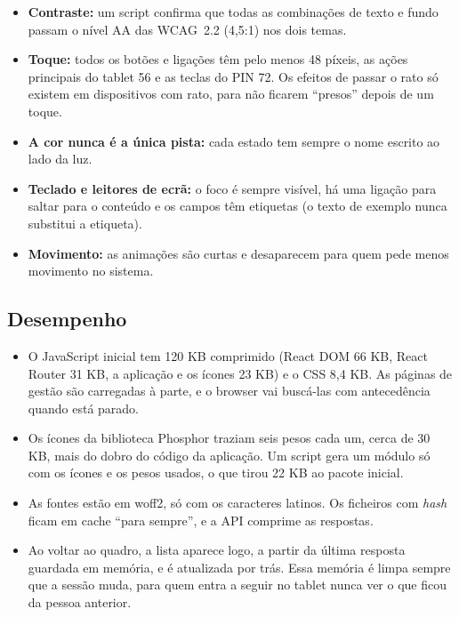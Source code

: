 \documentclass[a4paper,12pt]{article}
\begin{document}
\begin{itemize}
    \item \textbf{Contraste:} um script confirma que todas as combinações de texto e fundo passam o nível AA das \ac{WCAG}~2.2 (4,5:1) nos dois temas.
    \item \textbf{Toque:} todos os botões e ligações têm pelo menos 48 píxeis, as ações principais do tablet 56 e as teclas do PIN 72. Os efeitos de passar o rato só existem em dispositivos com rato, para não ficarem ``presos'' depois de um toque.
    \item \textbf{A cor nunca é a única pista:} cada estado tem sempre o nome escrito ao lado da luz.
    \item \textbf{Teclado e leitores de ecrã:} o foco é sempre visível, há uma ligação para saltar para o conteúdo e os campos têm etiquetas (o texto de exemplo nunca substitui a etiqueta).
    \item \textbf{Movimento:} as animações são curtas e desaparecem para quem pede menos movimento no sistema.
\end{itemize}

\subsection{Desempenho}

\begin{itemize}
    \item O JavaScript inicial tem 120 KB comprimido (React DOM 66 KB, React Router 31 KB, a aplicação e os ícones 23 KB) e o CSS 8,4 KB. As páginas de gestão são carregadas à parte, e o browser vai buscá-las com antecedência quando está parado.
    \item Os ícones da biblioteca Phosphor traziam seis pesos cada um, cerca de 30 KB, mais do dobro do código da aplicação. Um script gera um módulo só com os ícones e os pesos usados, o que tirou 22 KB ao pacote inicial.
    \item As fontes estão em woff2, só com os caracteres latinos. Os ficheiros com \textit{hash} ficam em cache ``para sempre'', e a \ac{API} comprime as respostas.
    \item Ao voltar ao quadro, a lista aparece logo, a partir da última resposta guardada em memória, e é atualizada por trás. Essa memória é limpa sempre que a sessão muda, para quem entra a seguir no tablet nunca ver o que ficou da pessoa anterior.
\end{itemize}

\end{document}
